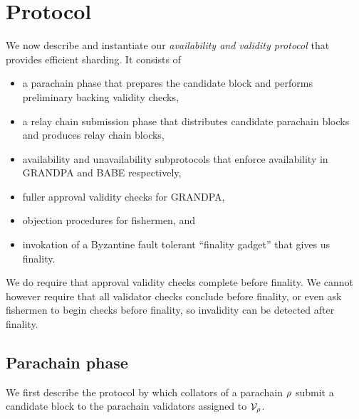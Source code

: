 
\section{Protocol} %
\label{sec:protocol}

We now describe and instantiate our {\em availability and validity protocol} that provides efficient sharding.  It consists of 
\begin{itemize}
\item a parachain phase that prepares the candidate block and performs preliminary backing validity checks,
\item a relay chain submission phase that distributes candidate parachain blocks and produces relay chain blocks,
\item availability and unavailability subprotocols that enforce availability in GRANDPA and BABE respectively,
\item fuller approval validity checks for GRANDPA,
\item objection procedures for fishermen, and
\item invokation of a Byzantine fault tolerant ``finality gadget'' that gives us finality.
\end{itemize}

We do require that approval validity checks complete before finality.  We cannot however require that all validator checks conclude before finality, or even ask fishermen to begin checks before finality, so invalidity can be detected after finality.



\subsection{Parachain phase} 
\label{sec:parachain}

We first describe the protocol by which collators of a parachain $\rho$ submit a candidate block to the parachain validators assigned to $\mathcal{V}_{\rho}$.

